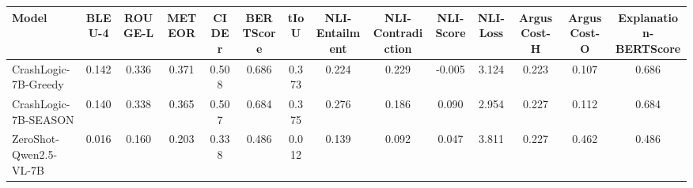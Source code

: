 \begin{tabular}{lccccccccccccc}
\toprule
Model & BLEU-4 & ROUGE-L & METEOR & CIDEr & BERTScore & tIoU & NLI-Entailment & NLI-Contradiction & NLI-Score & NLI-Loss & ArgusCost-H & ArgusCost-O & Explanation-BERTScore \\
\midrule
CrashLogic-7B-Greedy & 0.142 & 0.336 & 0.371 & 0.508 & 0.686 & 0.373 & 0.224 & 0.229 & -0.005 & 3.124 & 0.223 & 0.107 & 0.686 \\
CrashLogic-7B-SEASON & 0.140 & 0.338 & 0.365 & 0.507 & 0.684 & 0.375 & 0.276 & 0.186 & 0.090 & 2.954 & 0.227 & 0.112 & 0.684 \\
ZeroShot-Qwen2.5-VL-7B & 0.016 & 0.160 & 0.203 & 0.338 & 0.486 & 0.012 & 0.139 & 0.092 & 0.047 & 3.811 & 0.227 & 0.462 & 0.486 \\
\bottomrule
\end{tabular}
